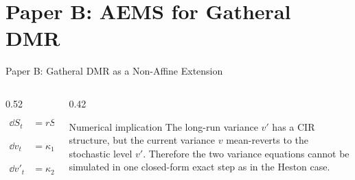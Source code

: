 \section{Paper B: AEMS for Gatheral DMR}

\begin{frame}{Paper B: Gatheral DMR as a Non-Affine Extension}

  \vspace{0.5em}
  \begin{columns}[T,onlytextwidth]
    \begin{column}{0.52\textwidth}
      \[
      \begin{aligned}
      \dd S_t &= rS_t\dd t+\sqrt{v_t}S_t\dd \widetilde W_t^{(1)},\\
      \dd v_t &= \kappa_1(v'_t-v_t)\dd t+\xi_1\sqrt{v_t}\dd \widetilde W_t^{(2)},\\
      \dd v'_t &= \kappa_2(\theta-v'_t)\dd t+\xi_2\sqrt{v'_t}\dd \widetilde W_t^{(3)}.
      \end{aligned}
      \]
    \end{column}
    \begin{column}{0.42\textwidth}
      \begin{block}{Numerical implication}
        The long-run variance \(v'\) has a CIR structure, but the current variance \(v\) mean-reverts to the stochastic level \(v'\). Therefore the two variance equations cannot be simulated in one closed-form exact step as in the Heston case.
      \end{block}
    \end{column}
  \end{columns}
\end{frame}

